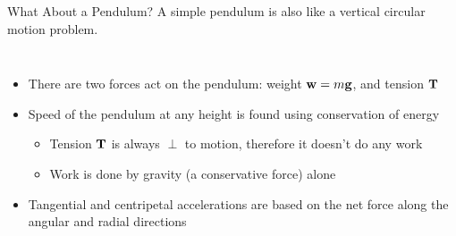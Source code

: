 \documentclass[12pt,compress,aspectratio=169]{beamer}
\newcommand{\mb}[1]{\ensuremath\mathbf{#1}}
\begin{document}
\begin{frame}{What About a Pendulum?}
  A simple pendulum is also like a vertical circular motion problem.

  \vspace{.1in}\begin{columns}

    \begin{itemize}
    \item There are two forces act on the pendulum: weight $\mb{w}=m\mb{g}$, and
    tension $\mb{T}$
    \item Speed of the pendulum at any height is found using conservation
      of energy
      \begin{itemize}
      \item Tension $\mb{T}$ is always $\perp$ to motion, therefore it doesn't
        do any work
      \item Work is done by gravity (a conservative force) alone
      \end{itemize}
    \item Tangential and centripetal accelerations are based on the net force
      along the angular and radial directions
    \end{itemize}
  \end{columns}
\end{frame}
\end{document}
